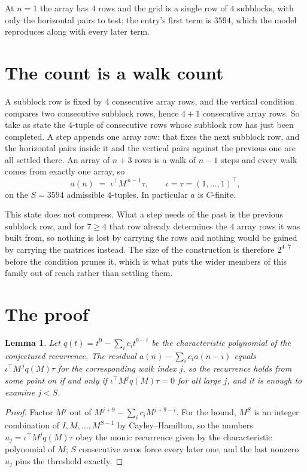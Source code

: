 \documentclass[11pt,a4paper]{article}
\theoremstyle{plain}
\newtheorem{lemma}[theorem]{Lemma}
\theoremstyle{definition}
\begin{document}
At $n=1$ the array has $4$ rows and the grid is a single row of $4$
subblocks, with only the horizontal pairs to test; the entry's first term is
$3594$, which the model reproduces along with every later term.

\section{The count is a walk count}

A subblock row is fixed by $4$ consecutive array rows, and the vertical condition compares
two consecutive subblock rows, hence $4+1$ consecutive array rows. So take as state the
$4$-tuple of consecutive rows whose subblock row has just been completed. A step appends one
array row: that fixes the next subblock row, and the horizontal pairs inside it and the
vertical pairs against the previous one are all settled there. An array of $n+3$ rows is
a walk of $n-1$ steps and every walk comes from exactly one array, so
\[
a(n)\;=\;\iota^{\!\top}M^{\,n-1}\tau,\qquad\iota=\tau=(1,\dots,1)^{\!\top},
\]
on the $S=3594$ admissible $4$-tuples. In particular $a$ is $C$-finite.

This state does not compress. What a step needs of the past is the previous subblock row, and
for $7\ge4$ that row already determines the $4$ array rows it was built from, so nothing
is lost by carrying the rows and nothing would be gained by carrying the matrices instead. The
size of the construction is therefore $2^{4\cdot7}$ before the condition prunes
it, which is what puts the wider members of this family out of reach rather than settling them.

\section{The proof}

\begin{lemma}\label{lem:crit}
Let $q(t)=t^{9}-\sum_i c_it^{9-i}$ be the characteristic polynomial of the
conjectured recurrence. The residual $a(n)-\sum_ic_ia(n-i)$ equals
$\iota^{\!\top}M^{\,j}q(M)\tau$ for the corresponding walk index $j$, so the recurrence
holds from some point on if and only if $\iota^{\!\top}M^{j}q(M)\tau=0$ for all large $j$,
and it is enough to examine $j<S$.
\end{lemma}

\begin{proof}
Factor $M^{j}$ out of $M^{j+9}-\sum_ic_iM^{j+9-i}$. For the bound, $M^{S}$
is an integer combination of $I,M,\dots,M^{S-1}$ by Cayley--Hamilton, so the numbers
$u_j=\iota^{\!\top}M^{j}q(M)\tau$ obey the monic recurrence given by the characteristic
polynomial of $M$; $S$ consecutive zeros force every later one, and the last nonzero $u_j$
pins the threshold exactly.
\end{proof}
\end{document}

